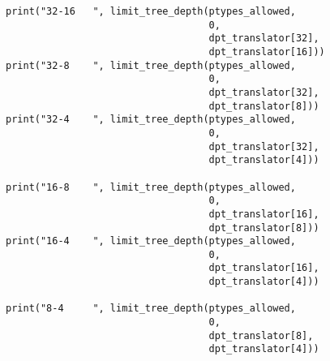 \begin{verbatim}
print("32-16   ", limit_tree_depth(ptypes_allowed, 
                                   0,  
                                   dpt_translator[32], 
                                   dpt_translator[16]))
print("32-8    ", limit_tree_depth(ptypes_allowed, 
                                   0,  
                                   dpt_translator[32], 
                                   dpt_translator[8]))
print("32-4    ", limit_tree_depth(ptypes_allowed, 
                                   0,  
                                   dpt_translator[32], 
                                   dpt_translator[4]))
 
print("16-8    ", limit_tree_depth(ptypes_allowed, 
                                   0,  
                                   dpt_translator[16], 
                                   dpt_translator[8]))
print("16-4    ", limit_tree_depth(ptypes_allowed, 
                                   0,  
                                   dpt_translator[16], 
                                   dpt_translator[4]))
 
print("8-4     ", limit_tree_depth(ptypes_allowed, 
                                   0,  
                                   dpt_translator[8], 
                                   dpt_translator[4]))

\end{verbatim}